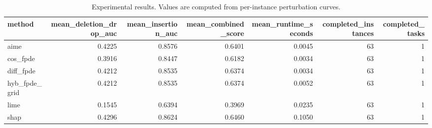 \begin{table}[t]
\caption{Experimental results. Values are computed from per-instance perturbation curves.}
\label{tab:main_results_computed}
\centering
\begin{tabular}{lrrrrrr}
\toprule
method & mean\_deletion\_drop\_auc & mean\_insertion\_auc & mean\_combined\_score & mean\_runtime\_seconds & completed\_instances & completed\_tasks \\
\midrule
aime & 0.4225 & 0.8576 & 0.6401 & 0.0045 & 63 & 1 \\
cos\_fpde & 0.3916 & 0.8447 & 0.6182 & 0.0034 & 63 & 1 \\
diff\_fpde & 0.4212 & 0.8535 & 0.6374 & 0.0034 & 63 & 1 \\
hyb\_fpde\_grid & 0.4212 & 0.8535 & 0.6374 & 0.0052 & 63 & 1 \\
lime & 0.1545 & 0.6394 & 0.3969 & 0.0235 & 63 & 1 \\
shap & 0.4296 & 0.8624 & 0.6460 & 0.1050 & 63 & 1 \\
\bottomrule
\end{tabular}

\end{table}
